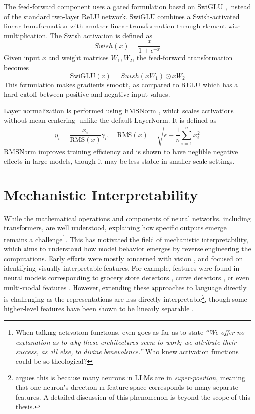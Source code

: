 The feed-forward component uses a gated formulation based on SwiGLU \citep{swiglu}, instead of the standard two-layer ReLU network. SwiGLU combines a Swish-activated linear transformation with another linear transformation through element-wise multiplication. The Swish activation is defined as
\begin{equation}
Swish(x) = \frac{x}{1 + e^{-x}}
\end{equation}
Given input $x$ and weight matrices $W_1, W_2$, the feed-forward transformation becomes
\begin{equation}
\text{SwiGLU}(x) = Swish(xW_1) \odot xW_2
\end{equation}
This formulation makes gradients smooth, as compared to RELU which has a hard cutoff between positive and negative input values.

Layer normalization is performed using RMSNorm \citep{rmsnorm}, which scales activations without mean-centering, unlike the default LayerNorm. It is defined as
\begin{equation}
y_i = \frac{x_i}{\mathrm{RMS}(x)} \gamma_i, \quad
\mathrm{RMS}(x) = \sqrt{\epsilon + \frac{1}{n} \sum_{i=1}^{n} x_i^2}
\end{equation}
RMSNorm improves training efficiency and is shown to have neglible negative effects in large models, though it may be less stable in smaller-scale settings.

\section{Mechanistic Interpretability}\label{sec:background_interpretability}

While the mathematical operations and components of neural networks, including transformers, are well understood, explaining how specific outputs emerge remains a challenge\footnote{When talking activation functions, \citet[3]{swiglu} even goes as far as to state \textit{``We offer no explanation as to why these architectures seem to work; we attribute their success, as all else, to divine benevolence.''} Who knew activation functions could be so theological?}. This has motivated the field of mechanistic interpretability, which aims to understand how model behavior emerges by reverse engineering the computations. Early efforts were mostly concerned with vision \citep{cammarata2020a}, and focused on identifying visually interpretable features. For example, features were found in neural models corresponding to grocery store detectors \citep{nguyen2016}, curve detectors \citep{cammarata2020b}, or even multi-modal features \citep{goh2021}.  However, extending these approaches to language directly is challenging as the representations are less directly interpretable\footnote{\citet{elhage2022a, templeton2024, bricken2023} argues this is because many neurons in LLMs are in \textit{super-position}, meaning that one neuron's direction in feature space corresponds to many separate features. A detailed discussion of this phenomenon is beyond the scope of this thesis.}, though some higher-level features have been shown to be linearly separable \citep{park2024}.

